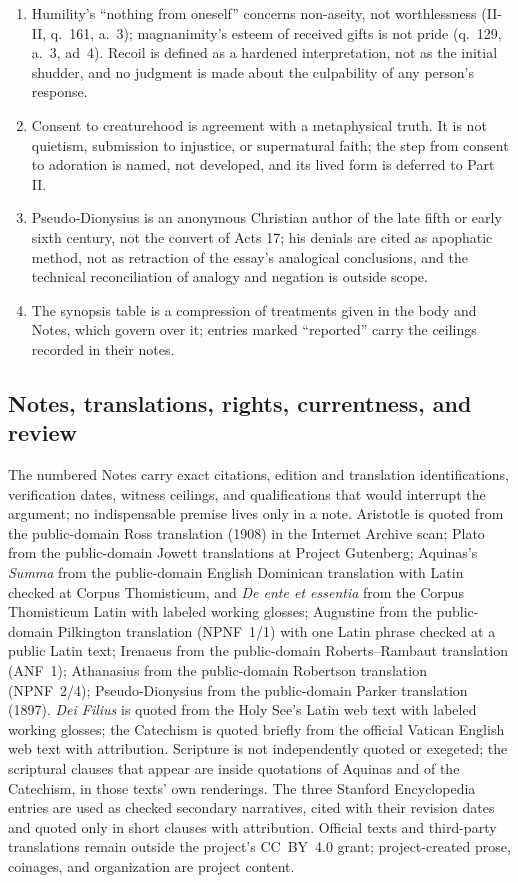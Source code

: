 \begin{enumerate}[leftmargin=1.45em,itemsep=0.25em]
\item Humility's ``nothing from oneself'' concerns non-aseity, not worthlessness (II-II, q.~161, a.~3); magnanimity's esteem of received gifts is not pride (q.~129, a.~3, ad~4). Recoil is defined as a hardened interpretation, not as the initial shudder, and no judgment is made about the culpability of any person's response.
\item Consent to creaturehood is agreement with a metaphysical truth. It is not quietism, submission to injustice, or supernatural faith; the step from consent to adoration is named, not developed, and its lived form is deferred to Part II.
\item Pseudo-Dionysius is an anonymous Christian author of the late fifth or early sixth century, not the convert of Acts 17; his denials are cited as apophatic method, not as retraction of the essay's analogical conclusions, and the technical reconciliation of analogy and negation is outside scope.
\item The synopsis table is a compression of treatments given in the body and Notes, which govern over it; entries marked ``reported'' carry the ceilings recorded in their notes.
\end{enumerate}

\subsection{Notes, translations, rights, currentness, and review}

The numbered Notes carry exact citations, edition and translation identifications, verification dates, witness ceilings, and qualifications that would interrupt the argument; no indispensable premise lives only in a note. Aristotle is quoted from the public-domain Ross translation (1908) in the Internet Archive scan; Plato from the public-domain Jowett translations at Project Gutenberg; Aquinas's \emph{Summa} from the public-domain English Dominican translation with Latin checked at Corpus Thomisticum, and \emph{De ente et essentia} from the Corpus Thomisticum Latin with labeled working glosses; Augustine from the public-domain Pilkington translation (NPNF~1/1) with one Latin phrase checked at a public Latin text; Irenaeus from the public-domain Roberts--Rambaut translation (ANF~1); Athanasius from the public-domain Robertson translation (NPNF~2/4); Pseudo-Dionysius from the public-domain Parker translation (1897). \emph{Dei Filius} is quoted from the Holy See's Latin web text with labeled working glosses; the Catechism is quoted briefly from the official Vatican English web text with attribution. Scripture is not independently quoted or exegeted; the scriptural clauses that appear are inside quotations of Aquinas and of the Catechism, in those texts' own renderings. The three Stanford Encyclopedia entries are used as checked secondary narratives, cited with their revision dates and quoted only in short clauses with attribution. Official texts and third-party translations remain outside the project's CC~BY~4.0 grant; project-created prose, coinages, and organization are project content.

